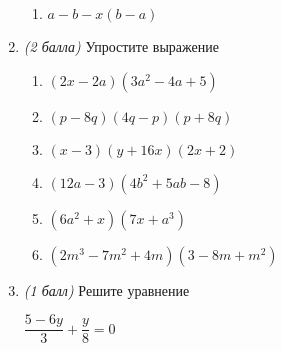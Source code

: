 \documentclass[12pt, a4paper]{article}
\begin{document}
\begin{enumerate}
\begin{multicols}{2}
\begin{enumerate}[label=\asbuk*)]
			\item $a-b-x(b-a)$
		\end{enumerate}
	\end{multicols}
	\item \textit{(2 балла)} Упростите выражение
	\begin{multicols}{2}
		\begin{enumerate}[label=\asbuk*)]
			\item $(2x-2a)(3a^2-4a+5)$
			\item $(p-8q)(4q-p)(p+8q)$
			\item $(x-3)(y+16x)(2x+2)$
			\item $(12a-3)(4b^2+5ab-8)$
			\item $(6a^2+x)(7x+a^3)$
			\item $(2m^3-7m^2+4m)(3-8m+m^2)$
		\end{enumerate}
	\end{multicols}
	\item \textit{(1 балл)} Решите уравнение

		$\dfrac{5-6y}{3}+\dfrac{y}{8}=0$
	\end{enumerate}
\end{document}
